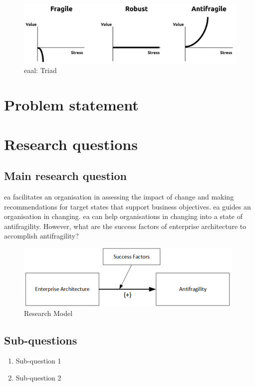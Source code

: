 \begin{figure}[h!]
	\centering
	\includegraphics[width=0.7\linewidth]{images/eaal-triad}
	\caption[EAAL Triad]{\acrshort{eaal}: Triad \parencite{Botjes2020}}
	\label{fig:eaal-triad}
\end{figure}


\section{Problem statement}
\label{sec:problemstatement}

\section{Research questions}
\label{sec:research-questions}

\subsection{Main research question}
\label{sub:main-research-question}
\acrshort{ea} facilitates an organisation in assessing the impact of change and making recommendations for target states that support business objectives. \acrshort{ea} guides an organisation in changing. \acrshort{ea} can help organisations in changing into a state of \gls{antifragility}. However, what are the success factors of enterprise architecture to accomplish \gls{antifragility}?
\begin{figure}[!h]
	\centering
	\includegraphics[width=0.7\linewidth]{images/conceptmodel}
	\caption[Research Model]{Research Model}
	\label{fig:researchmodel}
\end{figure}
\begin{center}
\end{center}

\subsection{Sub-questions}
\label{sub:sub-questions}

\begin{enumerate}
	\item{Sub-question 1}
	\item{Sub-question 2}
\end{enumerate}
